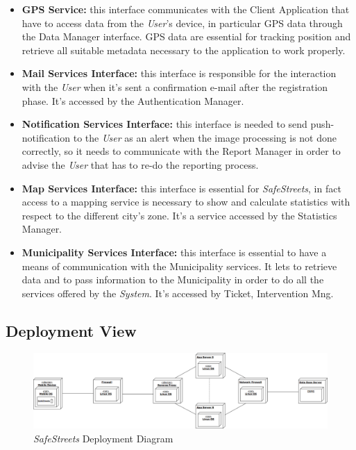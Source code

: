 \documentclass{article}
\begin{document}
		\begin{itemize}
			\item {\bf GPS Service:} this interface communicates with the Client Application that have to access data from the {\it User}'s device, in particular GPS data through the Data Manager interface. GPS data are essential for tracking position and retrieve all suitable metadata necessary to the application to work properly. 
			\item {\bf Mail Services Interface:} this interface is responsible for the interaction with the {\it User} when it's sent a confirmation e-mail after the registration phase. It's accessed by the Authentication Manager.
			\item {\bf Notification Services Interface:} this interface is needed to send push-notification to the {\it User} as an alert when the image processing is not done correctly, so it needs to communicate with the Report Manager in order to advise the {\it User} that has to re-do the reporting process. 
			\item {\bf Map Services Interface:} this interface is essential for {\it SafeStreets}, in fact access to a mapping service is necessary to show and calculate statistics with respect to the different city's zone. It's a service accessed by the Statistics Manager. \\
			\item {\bf Municipality Services Interface:} this interface is essential to have a means of communication with the Municipality services. It lets to retrieve data and to pass information to the Municipality in order to do all the services offered by the {\it System}. It's accessed by Ticket, Intervention Mng. 
		\end{itemize}
		
		
	\subsection{Deployment View}
		\begin{figure}[H]
			\centering
			\includegraphics[scale=0.22]{Images/Diagrams/deployment_diagram.png}
			\caption{{\it SafeStreets} Deployment Diagram}
		\end{figure}
		
\end{document}
